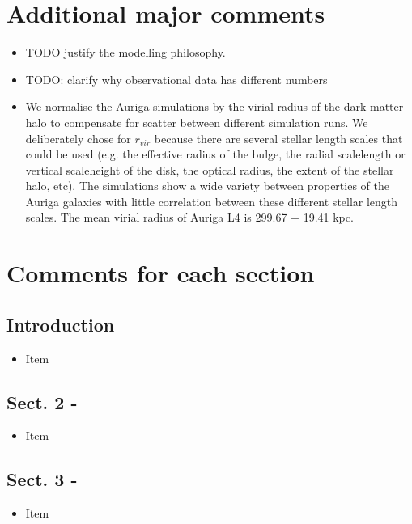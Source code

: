 \documentclass{article}
\begin{document}
\section*{Additional major comments}
\begin{itemize}
\item TODO justify the modelling philosophy.
\item TODO: clarify why observational data has different numbers
\item We normalise the Auriga simulations by the virial radius of the
dark matter halo to compensate for scatter between different simulation runs. We
deliberately chose for $r_{vir}$ because there are several stellar length scales
that could be used (e.g. the effective radius of the bulge, the radial scalelength
or vertical scaleheight of the disk, the optical radius, the extent of the stellar 
halo, etc). The simulations show a wide variety between properties of the Auriga
galaxies with little correlation between these different stellar length scales.
The mean virial radius of Auriga L4 is 299.67 $\pm$ 19.41 kpc.

\end{itemize}


\section*{Comments for each section}
\subsection*{Introduction}
\begin{itemize}
\item Item
\end{itemize}

\subsection*{Sect. 2 -}
\begin{itemize}
\item Item
\end{itemize}

\subsection*{Sect. 3 -}
\begin{itemize}
\item Item 
\end{itemize}
\end{document}
